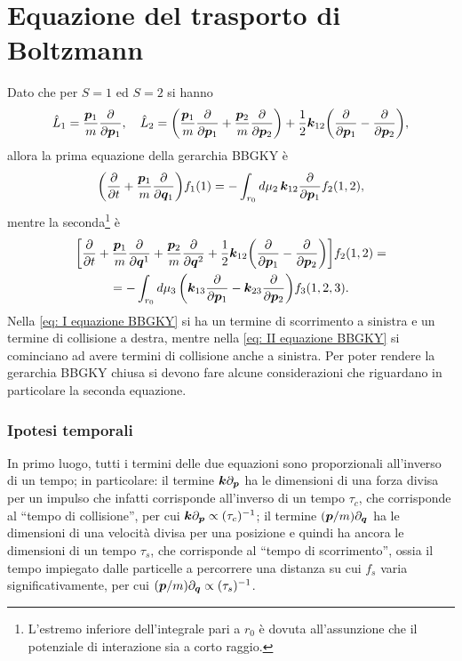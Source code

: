 \section{Equazione del trasporto di Boltzmann}
Dato che per $S = 1$ ed $S = 2$ si hanno
\begin{align}
    \hat{L}_1 = \frac{\bm{p}_1}{m}\frac{\partial}{\partial \bm{p}_1},\quad \hat{L}_2 = \bigg(\frac{\bm{p}_1}{m}\frac{\partial}{\partial \bm{p}_1} + \frac{\bm{p}_2}{m}\frac{\partial}{\partial \bm{p}_2}\bigg) + \frac{1}{2}\bm{k}_{12}\bigg(\frac{\partial}{\partial \bm{p}_1} - \frac{\partial}{\partial \bm{p}_2}\bigg),
\end{align}
allora la prima equazione della gerarchia BBGKY è
\begin{equation}
\label{eq: I equazione BBGKY}
    \bigg(\frac{\partial}{\partial t} + \frac{\bm{p}_1}{m}\frac{\partial}{\partial \bm{q}_1}\bigg)f_1(1) = -\int_{r_0}d\mu_2\,\bm{k}_{12}\frac{\partial}{\partial \bm{p}_1}f_2(1,2),
\end{equation}
mentre la seconda\footnote{L'estremo inferiore dell'integrale pari a $r_0$ è dovuta all'assunzione che il potenziale di interazione sia a corto raggio.} è
\begin{multline}
\label{eq: II equazione BBGKY}
    \bigg[\frac{\partial}{\partial t} + \frac{\bm{p}_1}{m}\frac{\partial}{\partial \bm{q}^1} + \frac{\bm{p}_2}{m}\frac{\partial}{\partial \bm{q}^2} + \frac{1}{2}\bm{k}_{12}\bigg(\frac{\partial}{\partial \bm{p}_1} - \frac{\partial}{\partial \bm{p}_2}\bigg)\bigg]f_2(1,2) = \\
    = -\int_{r_0}d\mu_3\,\bigg(\bm{k}_{13}\frac{\partial}{\partial \bm{p}_1} - \bm{k}_{23}\frac{\partial}{\partial \bm{p}_2}\bigg)f_3(1,2,3).
\end{multline}
Nella \eqref{eq: I equazione BBGKY} si ha un termine di scorrimento a sinistra e un termine di collisione a destra, mentre nella \eqref{eq: II equazione BBGKY} si cominciano ad avere termini di collisione anche a sinistra. Per poter rendere la gerarchia BBGKY chiusa si devono fare alcune considerazioni che riguardano in particolare la seconda equazione.

\subsubsection{Ipotesi temporali}
In primo luogo, tutti i termini delle due equazioni sono proporzionali all'inverso di un tempo; in particolare: il termine $\bm{k}\partial_{\bm{p}}$ ha le dimensioni di una forza divisa per un impulso che infatti corrisponde all'inverso di un tempo $\tau_c$, che corrisponde al   ``tempo di collisione'', per cui $\bm{k}\partial_{\bm{p}} \propto (\tau_c)^{-1}$; il termine $(\bm{p}/m)\partial_{\bm{q}}$ ha le dimensioni di una velocità divisa per una posizione e quindi ha ancora le dimensioni di un tempo $\tau_s$, che corrisponde al ``tempo di scorrimento'', ossia il tempo impiegato dalle particelle a percorrere una distanza su cui $f_s$ varia significativamente, per cui  $(\bm{p}/m)\partial_{\bm{q}} \propto (\tau_s)^{-1}$.

